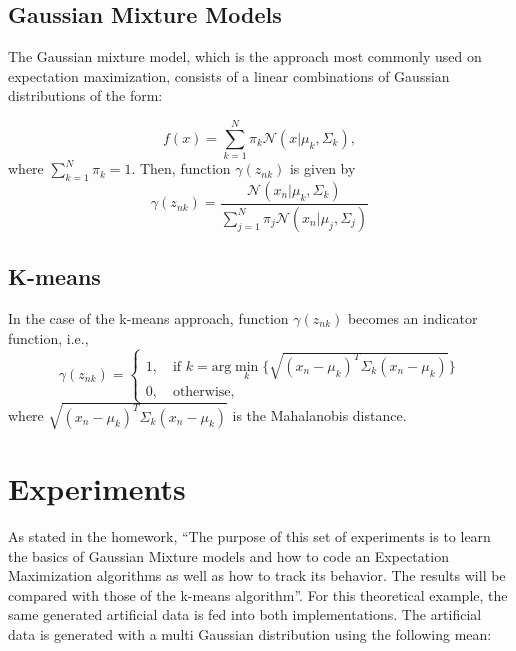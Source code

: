 \documentclass[letterpaper, 10 pt, conference]{ieeeconf}  %
\begin{document}
\subsection{Gaussian Mixture Models}
\label{sec:TheoryGMM}

The Gaussian mixture model, which is the approach most commonly used on expectation maximization, consists of a linear
combinations of Gaussian distributions  of the form:

\begin{equation}
 f(x) =  \sum_{k=1}^{N} \pi_{k} \mathcal{N}(x | \mu_{k},\Sigma_{k}),
 \label{eq:GMMEq}
\end{equation}
where $\sum_{k=1}^{N} \pi_{k} = 1$. Then, function $\gamma(z_{nk})$ is given by
\begin{equation*}
 \gamma(z_{nk}) = \frac{ \mathcal{N}(x_{n} | \mu_{k},\Sigma_{k})}{\sum_{j=1}^{N} \pi_{j} \mathcal{N}(x_{n} | \mu_{j},\Sigma_{j})}
\end{equation*}

\subsection{K-means}
\label{sec:TheoryKmeans}

In the case of the k-means approach, function $\gamma(z_{nk})$ becomes an indicator function, i.e.,
{\small
\begin{equation*}
  \gamma(z_{nk}) =\left\{
                \begin{array}{ll}
                  1, \quad \text{if } k = \text{arg}\min_{k}{\{\sqrt{(x_{n} - \mu_{k})^{T}\Sigma_{k} (x_{n} - \mu_{k})}\}} \\
                  0, \quad \text{otherwise,}
                \end{array}
              \right.
\end{equation*}}
where $\sqrt{(x_{n} - \mu_{k})^{T}\Sigma_{k} (x_{n} - \mu_{k})}$ is the Mahalanobis distance.



\section{Experiments}
\label{sec:Experiments}

As stated in the homework, ``The purpose of this set of experiments is to learn the basics of Gaussian Mixture models and how to code an 
Expectation Maximization algorithms as well as how to track its behavior. The results will be compared with those of the k-means algorithm''. 
For this theoretical example, the same generated artificial data is fed into both implementations. The artificial data is generated with a multi 
Gaussian distribution using the following mean:
\end{document}
